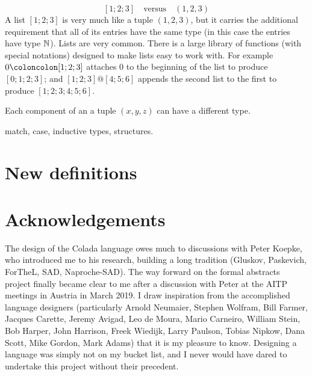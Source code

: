 \documentclass[12pt]{article}
\numberwithin{definition}{section}
\begin{document}
\[
\boxed{[1;2;3]} \quad\text{versus}\quad \boxed{(1,2,3)}
\]
A list $[1;2;3]$ is very much like a tuple $(1,2,3)$, but it
carries the additional requirement that all of its entries have the
same type (in this case the entries have type ${\mathbb N}$).  Lists are very
common.  There is a large library of functions (with special
notations) designed to make lists easy to work with.  For example $0
\coloncolon[1;2;3]$ attaches $0$ to the beginning of the list to
produce $[0;1;2;3]$; and $[1;2;3] @ [4;5;6]$ appends the second list
to the first to produce $[1;2;3;4;5;6]$.

Each component of an a tuple $(x,y,z)$ can have a different type.


match,  case, inductive types, structures.

\section{New definitions}


\section{Acknowledgements}
The design of the Colada language owes much to discussions with Peter
Koepke, who introduced me to his research, building a long tradition
(Gluskov, Paskevich, ForTheL, SAD, Naproche-SAD).  The way forward on
the formal abstracts project finally became clear to me after a
discussion with Peter at the AITP meetings in Austria in March 2019. I
draw inspiration from the accomplished language designers
(particularly Arnold Neumaier, Stephen Wolfram, Bill Farmer, Jacques
Carette, Jeremy Avigad, Leo de Moura, Mario Carneiro, William Stein,
Bob Harper, John Harrison, Freek Wiedijk, Larry Paulson, Tobias
Nipkow, Dana Scott, Mike Gordon, Mark Adams) that it is my pleasure to
know.  Designing a language was simply not on my bucket list, and I
never would have dared to undertake this project without their
precedent.
\end{document}
